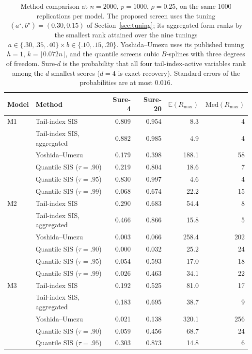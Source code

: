\begin{table}[t]
\centering
\caption{Method comparison at $n=2000$, $p=1000$, $\rho=0.25$, on the same 1000 replications per model. The proposed screen uses the tuning $(a^\star,b^\star)=(0.30,0.15)$ of Section~\ref{sec:tuning}; its aggregated form ranks by the smallest rank attained over the nine tunings $a\in\{.30,.35,.40\}\times b\in\{.10,.15,.20\}$. Yoshida--Umezu uses its published tuning $h=1$, $k=\lfloor0.072n\rfloor$, and the quantile screens cubic $B$-splines with three degrees of freedom. Sure-$d$ is the probability that all four tail-index-active variables rank among the $d$ smallest scores ($d=4$ is exact recovery). Standard errors of the probabilities are at most $0.016$.}
\label{tab:comparison}
\begin{tabular}{llrrrr}
\toprule
Model & Method & Sure-4 & Sure-20 & $\mathbb{E}(R_{\max})$ & $\mathrm{Med}(R_{\max})$\\
\midrule
M1 & Tail-index SIS & 0.809 & 0.954 & 8.3 & 4\\
 & Tail-index SIS, aggregated & 0.882 & 0.985 & 4.9 & 4\\
 & Yoshida--Umezu & 0.179 & 0.398 & 188.1 & 58\\
 & Quantile SIS ($\tau=.90$) & 0.219 & 0.804 & 18.6 & 7\\
 & Quantile SIS ($\tau=.95$) & 0.830 & 0.997 & 4.6 & 4\\
 & Quantile SIS ($\tau=.99$) & 0.068 & 0.674 & 22.2 & 15\\
\addlinespace
M2 & Tail-index SIS & 0.290 & 0.683 & 54.4 & 8\\
 & Tail-index SIS, aggregated & 0.466 & 0.866 & 15.8 & 5\\
 & Yoshida--Umezu & 0.003 & 0.066 & 258.4 & 202\\
 & Quantile SIS ($\tau=.90$) & 0.000 & 0.032 & 25.2 & 24\\
 & Quantile SIS ($\tau=.95$) & 0.054 & 0.593 & 17.0 & 18\\
 & Quantile SIS ($\tau=.99$) & 0.026 & 0.463 & 34.1 & 22\\
\addlinespace
M3 & Tail-index SIS & 0.192 & 0.525 & 81.0 & 17\\
 & Tail-index SIS, aggregated & 0.183 & 0.695 & 38.7 & 9\\
 & Yoshida--Umezu & 0.021 & 0.138 & 320.1 & 256\\
 & Quantile SIS ($\tau=.90$) & 0.059 & 0.456 & 68.7 & 24\\
 & Quantile SIS ($\tau=.95$) & 0.303 & 0.873 & 14.8 & 6\\

\end{tabular}
\end{table}

